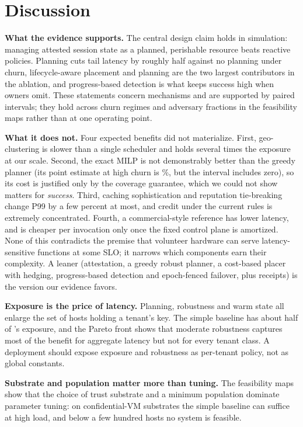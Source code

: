 \section{Discussion}
\label{sec:discussion}

\textbf{What the evidence supports.} The central design claim holds in simulation: managing attested session state as a planned, perishable resource beats reactive policies. Planning cuts tail latency by roughly half against no planning
under churn, lifecycle-aware placement and planning are the two largest contributors in the ablation, and progress-based detection is what keeps success high when owners omit. These statements concern mechanisms and are supported by paired intervals; they
hold across churn regimes and adversary fractions in the feasibility maps rather than at one operating point.

\textbf{What it does not.} Four expected benefits did not materialize. First, geo-clustering is slower than a single scheduler and holds several times the exposure at our scale. Second, the exact MILP is not demonstrably better than the greedy planner (its point estimate at high churn is \MilpGreedyHigh\%, but the interval includes zero), so its cost is justified only by
the coverage guarantee, which we could not show matters for \emph{success}. Third, caching sophistication and reputation tie-breaking change P99 by a few percent at most, and credit under the current rules is extremely concentrated. Fourth, a commercial-style reference has lower
latency, and \voss{} is cheaper per invocation only once the fixed control plane is amortized. None of this contradicts the premise that volunteer hardware can serve latency-sensitive functions at some SLO; it narrows which components earn their complexity. A leaner \voss{} (attestation,
a greedy robust planner, a cost-based placer with hedging, progress-based detection and epoch-fenced failover, plus receipts) is the version our evidence favors.

\textbf{Exposure is the price of latency.} Planning, robustness and warm state all enlarge the set of hosts holding a tenant's key. The simple baseline has about half of \voss{}'s exposure, and the Pareto front shows that moderate robustness captures most of the benefit for aggregate latency
but not for every tenant class. A deployment should expose exposure and robustness as per-tenant policy, not as global constants.

\textbf{Substrate and population matter more than tuning.} The feasibility maps show that the choice of trust substrate and a minimum population dominate parameter tuning: on confidential-VM substrates the simple baseline can suffice at high load, and below a few hundred hosts no system is feasible.

